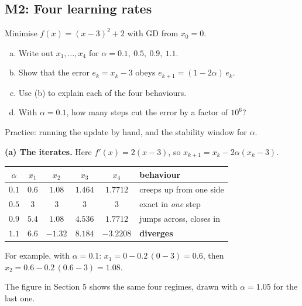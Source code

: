 \subsection{M2: Four learning rates}

\begin{frame}{}
  \begin{probbox}
    Minimise $f(x) = (x-3)^2 + 2$ with GD from $x_0 = 0$.
    \begin{enumerate}[(a)]
      \item Write out $x_1, \dots, x_4$ for $\alpha = 0.1,\ 0.5,\ 0.9,\ 1.1$.
      \item Show that the error $e_k = x_k - 3$ obeys $e_{k+1} = (1 - 2\alpha)\,e_k$.
      \item Use (b) to explain each of the four behaviours.
      \item With $\alpha = 0.1$, how many steps cut the error by a factor of $10^6$?
    \end{enumerate}
  \end{probbox}
  \footnotesize\textcolor{mGrey}{Practice: running the update by hand, and the stability window for $\alpha$.}
\end{frame}

\begin{frame}{}
  \textbf{(a) The iterates.} Here $f'(x) = 2(x - 3)$, so $x_{k+1} = x_k - 2\alpha(x_k - 3)$.
  \begin{center}\small
  \begin{tabular}{@{}c c c c c l@{}}
    \toprule
    $\alpha$ & $x_1$ & $x_2$ & $x_3$ & $x_4$ & behaviour \\
    \midrule
    $0.1$ & $0.6$ & $1.08$ & $1.464$ & $1.7712$ & creeps up from one side \\
    $0.5$ & $3$ & $3$ & $3$ & $3$ & exact in \emph{one} step \\
    $0.9$ & $5.4$ & $1.08$ & $4.536$ & $1.7712$ & jumps across, closes in \\
    $1.1$ & $6.6$ & $-1.32$ & $8.184$ & $-3.2208$ & \textcolor{mRed}{\textbf{diverges}} \\
    \bottomrule
  \end{tabular}
  \end{center}
  For example, with $\alpha = 0.1$: $x_1 = 0 - 0.2\,(0 - 3) = 0.6$, then $x_2 = 0.6 - 0.2\,(0.6 - 3) = 1.08$.

  \vspace{3pt}
  \footnotesize\textcolor{mGrey}{The figure in Section 5 shows the same four regimes, drawn with $\alpha = 1.05$ for the last one.}
\end{frame}

